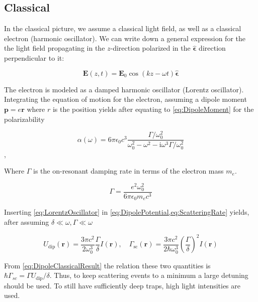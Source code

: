\subsection{Classical}

In the classical picture, we assume a classical light field, as well as a classical electron (harmonic oscillator). We can write down a general expression for the the light field propagating in the $z$-direction polarized in the $\bm{\hat{\epsilon}}$ direction perpendicular to it:

\begin{equation}\label{eq:ClassicalField}
	\mathbf{E}(z,t) = \mathbf{E}_0 \cos{(k z - \omega t)} 	\bm{\hat{\epsilon}}
\end{equation}
	 
The electron is modeled as a damped harmonic oscillator (Lorentz oscillator). Integrating the equation of motion for the electron, assuming a dipole moment $\mathbf{p} = e \mathbf{r}$ where $r$ is the position yields after equating to \cref{eq:DipoleMoment} for the polarizability \cite{Grimm2000}

\begin{equation}\label{eq:LorentzOscillator}
	\alpha(\omega)=6 \pi \epsilon_{0} c^{3} \frac{\Gamma / \omega_{0}^{2}}{\omega_{0}^{2}-\omega^{2}-\mathrm{i}\omega^3\Gamma/\omega_0^2}
\end{equation},

Where $\Gamma$ is the on-resonant damping rate in terms of the electron mass $m_e$. 

\begin{equation}\label{eq:ResonantDampingRate}
	\Gamma = \frac{e^2 \omega_0^2}{6\pi \epsilon_0 m_e c^3}
\end{equation}

Inserting \cref{eq:LorentzOscillator} in \cref{eq:DipolePotential,eq:ScatteringRate} yields, after assuming $\delta \ll \omega, \Gamma \ll \omega$

\begin{equation}\label{eq:DipoleClassicalResult} 
	U_{\text{dip}}(\mathbf{r}) = 
	\frac{3\pi c^2}{2\omega_0^3}\frac{\Gamma}{\delta} I(\mathbf{r}),
	\quad
	\Gamma_{\text{sc}}(\mathbf{r}) = 
	\frac{3\pi c^2}{2\hbar\omega_0^3}\left(\frac{\Gamma}{\delta}\right)^2 I(\mathbf{r})
\end{equation}

From \cref{eq:DipoleClassicalResult} the relation these two quantities is $\hbar \Gamma_{sc} =\Gamma U_{\text{dip}}/\delta$. Thus, to keep scattering events to a minimum a large detuning should be used. To still have sufficiently deep traps, high light intensities are used. 


